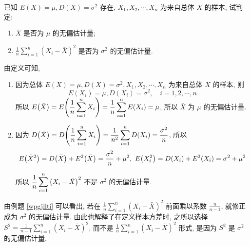 \begin{example}
    已知 $E(X)=\mu, D(X)=\sigma^{2} $ 存在, $ X_{1}, X_{2}, \cdots, X_{n} $ 为来自总体 $ X $ 的样本, 试判定:\label{wpgjllti}
    \begin{enumerate}[label=(\arabic{*})]
        \item $\bar{X} $ 是否为 $ \mu $ 的无偏估计量;
        \item $\displaystyle\frac{1}{n} \sum_{i=1}^{n}\left(X_{i}-\bar{X}\right)^{2} $ 是否为 $ \sigma^{2} $ 的无偏估计量.
    \end{enumerate}
\end{example}
\begin{solution}
    由定义可知, 
    \begin{enumerate}[label=(\arabic{*})]
        \item 因为总体 $ E(X)=\mu, D(X)=\sigma^{2}, X_{1}, X_{2}, \cdots, X_{n} $ 为来自总体 $ X $ 的样本, 则
              $$E\left(X_{i}\right)=\mu, D\left(X_{i}\right)=\sigma^{2}, \quad i=1,2, \cdots, n $$
              所以 $\displaystyle E\qty(\bar{X})=E\qty(\dfrac{1}{n}\sum_{i=1}^{n}X_i)=\dfrac{1}{n}\sum_{i=1}^{n}E(X_i)=\mu$, 
              所以 $\bar{X} $ 为 $ \mu $ 的无偏估计量.
        \item 因为 $\displaystyle D\qty(\bar{X})=D\qty(\dfrac{1}{n}\sum_{i=1}^{n}X_i)=\dfrac{1}{n^2}\sum_{i=1}^{n}D(X_i)=\dfrac{\sigma^2}{n}$, 所以
              $$E\qty(\bar{X}^2)=D\qty(\bar{X})+E^2\qty(\bar{X})=\dfrac{\sigma^2}{n}+\mu^2,~E\qty(X_i^2)=D(X_i)+E^2(X_i)=\sigma^2+\mu^2$$
              所以 $\displaystyle\dfrac{1}{n}\sum_{i=1}^{n}\qty(X_i-\bar{X})^2$ 不是 $\sigma^2$ 的无偏估计量.
    \end{enumerate}
\end{solution}

由例题 \ref{wpgjllti} 可以看出, 若在 $ \displaystyle\frac{1}{n} \sum_{i=1}^{n}\left(X_{i}-\bar{X}\right)^{2} $ 前面乘以系数
$ \displaystyle\frac{n}{n-1} $, 就修正成为 $ \sigma^{2} $ 的无偏估计量.
由此也解释了在定义样本方差时, 之所以选择 $\displaystyle S^{2}=\frac{1}{n-1} \sum_{i=1}^{n}\left(X_{i}-\bar{X}\right)^{2}$, 
而不是 $\displaystyle \frac{1}{n} \sum_{i=1}^{n}\left(X_{i}-\bar{X}\right)^{2} $ 形式, 是因为 $ S^{2} $ 是 $ \sigma^{2} $ 的无偏估计量.

